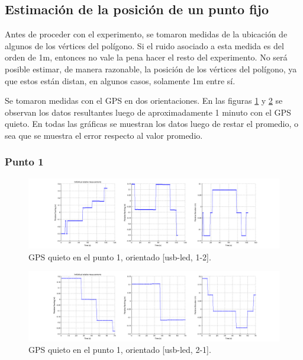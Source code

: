 \documentclass[spanish,12pt,a4paper,titlepage]{report}
\begin{document}
\newpage
\subsection{Estimación de la posición de un punto fijo}
\label{sec:estimacion-de-la-posicion-de-un-punto-fijo}

Antes de proceder con el experimento, se tomaron medidas de la ubicación de algunos de los vértices del polígono. Si el ruido asociado a esta medida es del orden de 1m, entonces no vale la pena hacer el resto del experimento. No será posible estimar, de manera razonable, la posición de los vértices del polígono, ya que estos están distan, en algunos casos, solamente 1m entre sí.

Se tomaron medidas con el GPS en dos orientaciones. En las figuras \ref{fig:log_09_individual.png} y \ref{fig:log_10_individual.png} se observan los datos resultantes luego de aproximadamente 1 minuto con el GPS quieto. En todas las gráficas se muestran los datos luego de restar el promedio, o sea que se muestra el error respecto al valor promedio.

\subsubsection*{Punto 1}
\label{sec:punto-1}

\begin{figure}[h!]
  \hspace{-70pt}
  \includegraphics[width=1.3\textwidth]{./img/log_09_individual.png}
  \caption{GPS quieto en el punto 1, orientado [usb-led, 1-2].}
  \label{fig:log_09_individual.png}
\end{figure}

\begin{figure}[h!]
  \hspace{-70pt}
  \includegraphics[width=1.3\textwidth]{./img/log_10_individual.png}
  \caption{GPS quieto en el punto 1, orientado [usb-led, 2-1].}
  \label{fig:log_10_individual.png}
\end{figure}
\end{document}
